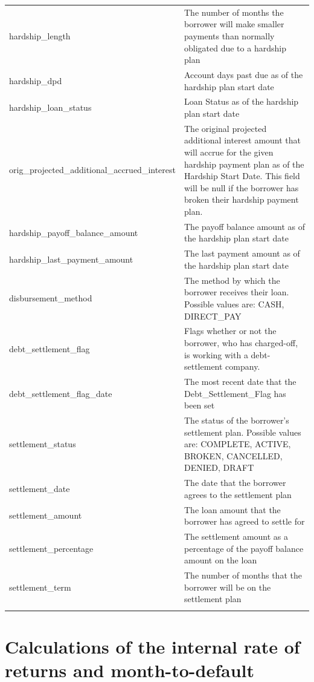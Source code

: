 \documentclass[11pt,]{report}
\begin{document}
\begin{longtable}[t]{>{\raggedright\arraybackslash}p{7cm}>{\raggedright\arraybackslash}p{7cm}}
\addlinespace
hardship\_length & The number of months the borrower will make smaller payments than normally obligated due to a hardship plan\\
hardship\_dpd & Account days past due as of the hardship plan start date\\
hardship\_loan\_status & Loan Status as of the hardship plan start date\\
orig\_projected\_additional\_accrued\_interest & The original projected additional interest amount that will accrue for the given hardship payment plan as of the Hardship Start Date. This field will be null if the borrower has broken their hardship payment plan.\\
hardship\_payoff\_balance\_amount & The payoff balance amount as of the hardship plan start date\\
\addlinespace
hardship\_last\_payment\_amount & The last payment amount as of the hardship plan start date\\
disbursement\_method & The method by which the borrower receives their loan. Possible values are: CASH, DIRECT\_PAY\\
debt\_settlement\_flag & Flags whether or not the borrower, who has charged-off, is working with a debt-settlement company.\\
debt\_settlement\_flag\_date & The most recent date that the Debt\_Settlement\_Flag has been set  \\
settlement\_status & The status of the borrower’s settlement plan. Possible values are: COMPLETE, ACTIVE, BROKEN, CANCELLED, DENIED, DRAFT\\
\addlinespace
settlement\_date & The date that the borrower agrees to the settlement plan\\
settlement\_amount & The loan amount that the borrower has agreed to settle for\\
settlement\_percentage & The settlement amount as a percentage of the payoff balance amount on the loan\\
settlement\_term & The number of months that the borrower will be on the settlement plan\\*
\end{longtable}

\hypertarget{calculations-of-the-internal-rate-of-returns-and-month-to-default}{%
\section{Calculations of the internal rate of returns and month-to-default}\label{calculations-of-the-internal-rate-of-returns-and-month-to-default}}
\end{document}
